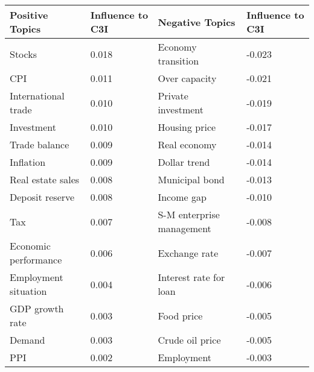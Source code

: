 \documentclass[10pt]{article}
\begin{document}
\begin {table}
 \begin {center}
 \begin {tabular} {llll}
\hline
Positive Topics	                    &	Influence to C3I	                       &	Negative Topics	                &	Influence to C3I \\
\hline							 
Stocks	                           &	0.018	                                &	Economy transition	                 &	-0.023	\\
CPI               	                   &	0.011	                                &	Over capacity	                          &	-0.021	\\
International trade	           &	0.010	                                &	Private investment                   	&	-0.019	\\
Investment	                   &	0.010	                                &	Housing price	                          &	-0.017	\\
Trade balance	                   &	0.009	                                &	Real economy	                          &	-0.014	\\
Inflation	                           &	0.009	                                &	Dollar trend	                          &	-0.014	\\
Real estate sales	          &	0.008	                                &	Municipal bond                      	 &	-0.013	\\
Deposit reserve	                  &	0.008	                                &	Income gap	                          &	-0.010	\\
Tax	                                   &	0.007	                                &	S-M enterprise management	 &	-0.008	\\
Economic performance	 &	0.006	                                &	Exchange rate	                          &	-0.007	\\
Employment situation	 &	0.004	                                &	Interest rate for loan	                  &	-0.006	\\
GDP growth rate	         &	0.003	                                &	Food price	                          &	-0.005	\\
Demand	                          &	0.003	                                &	Crude oil price	                           &	-0.005	\\
PPI                                    	&	0.002	                                &	Employment	                           &	-0.003	\\

\end{tabular}
\end{center}
\end{table}
\end{document}
